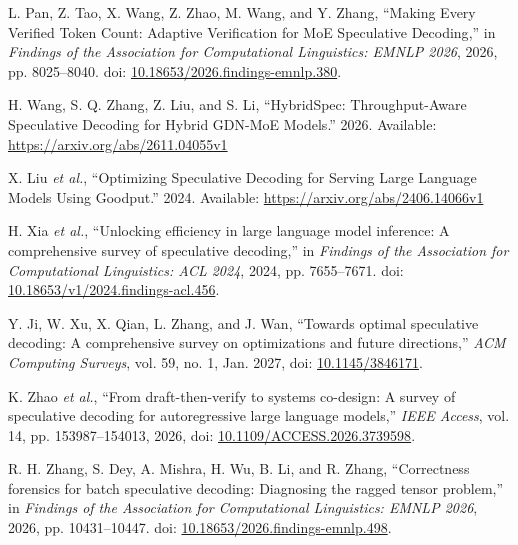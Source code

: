 \documentclass[11pt,a4paper,UTF8,fontset=none,scheme=plain,zihao=-4]{ctexart}
\newenvironment{CSLReferences}[2]{%
  \footnotesize
  \raggedright
  \setlength{\leftskip}{3em}%
  \setlength{\parindent}{-3em}%
  \setlength{\parskip}{0.1\baselineskip}%
  \sloppy
}{}
\newcommand{\CSLLeftMargin}[1]{\makebox[3em][l]{#1}}
\newcommand{\CSLRightInline}[1]{#1}
\begin{document}
\begin{CSLReferences}{0}{0}
\leavevmode{}%
\CSLLeftMargin{{[}8{]} }
\CSLRightInline{L. Pan, Z. Tao, X. Wang, Z. Zhao, M. Wang, and Y. Zhang,
{``{Making Every Verified Token Count: Adaptive Verification for MoE
Speculative Decoding},''} in \emph{Findings of the {A}ssociation for
{C}omputational {L}inguistics: {EMNLP} 2026}, 2026, pp. 8025--8040. doi:
\href{https://doi.org/10.18653/2026.findings-emnlp.380}{10.18653/2026.findings-emnlp.380}.}

\leavevmode{}%
\CSLLeftMargin{{[}9{]} }
\CSLRightInline{H. Wang, S. Q. Zhang, Z. Liu, and S. Li, {``{HybridSpec:
Throughput-Aware Speculative Decoding for Hybrid GDN-MoE Models}.''}
2026. Available: \url{https://arxiv.org/abs/2611.04055v1}}

\leavevmode{}%
\CSLLeftMargin{{[}10{]} }
\CSLRightInline{X. Liu \emph{et al.}, {``{Optimizing Speculative
Decoding for Serving Large Language Models Using Goodput}.''} 2024.
Available: \url{https://arxiv.org/abs/2406.14066v1}}

\leavevmode{}%
\CSLLeftMargin{{[}11{]} }
\CSLRightInline{H. Xia \emph{et al.}, {``Unlocking efficiency in large
language model inference: A comprehensive survey of speculative
decoding,''} in \emph{Findings of the {A}ssociation for {C}omputational
{L}inguistics: {ACL} 2024}, 2024, pp. 7655--7671. doi:
\href{https://doi.org/10.18653/v1/2024.findings-acl.456}{10.18653/v1/2024.findings-acl.456}.}

\leavevmode{}%
\CSLLeftMargin{{[}12{]} }
\CSLRightInline{Y. Ji, W. Xu, X. Qian, L. Zhang, and J. Wan, {``Towards
optimal speculative decoding: A comprehensive survey on optimizations
and future directions,''} \emph{ACM Computing Surveys}, vol. 59, no. 1,
Jan. 2027, doi:
\href{https://doi.org/10.1145/3846171}{10.1145/3846171}.}

\leavevmode{}%
\CSLLeftMargin{{[}13{]} }
\CSLRightInline{K. Zhao \emph{et al.}, {``From draft-then-verify to
systems co-design: A survey of speculative decoding for autoregressive
large language models,''} \emph{IEEE Access}, vol. 14, pp.
153987--154013, 2026, doi:
\href{https://doi.org/10.1109/ACCESS.2026.3739598}{10.1109/ACCESS.2026.3739598}.}

\leavevmode{}%
\CSLLeftMargin{{[}14{]} }
\CSLRightInline{R. H. Zhang, S. Dey, A. Mishra, H. Wu, B. Li, and R.
Zhang, {``Correctness forensics for batch speculative decoding:
Diagnosing the ragged tensor problem,''} in \emph{Findings of the
{A}ssociation for {C}omputational {L}inguistics: {EMNLP} 2026}, 2026,
pp. 10431--10447. doi:
\href{https://doi.org/10.18653/2026.findings-emnlp.498}{10.18653/2026.findings-emnlp.498}.}


\end{CSLReferences}
\end{document}
